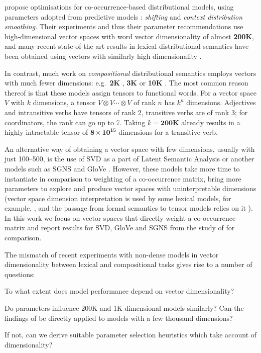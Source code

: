 \documentclass[11pt]{article}
\begin{document}
 propose optimisations for co-occurrence-based distributional models, using parameters adopted from predictive models \cite{mikolov2013efficient}: \emph{shifting} and \emph{context distribution smoothing}. Their experiments and thus their parameter  recommendations use high-dimensional vector spaces with word vector dimensionality of almost \textbf{200K}, and many recent state-of-the-art results in lexical distributional semantics have been obtained using vectors with similarly high dimensionality  \cite{baroni-dinu-kruszewski:2014:P14-1,kiela-clark:2014:CVSC,lapesa2014large}.

In contrast, much work on \emph{compositional} distributional semantics employs vectors with much fewer dimensions: e.g.~\textbf{2K} \cite{Grefenstette:2011:ESC:2145432.2145580,kartsadrqpl2014,milajevs-EtAl:2014:EMNLP2014}, \textbf{3K} \cite{Dinu:2010:MDS:1870658.1870771,milajevs-purver:2014:CVSC} or \textbf{10K} \cite{polajnar-clark:2014:EACL,Baroni2010nouns}. The most common reason thereof is that these models  assign tensors to functional words. For a vector space $V$ with $k$ dimensions,  a tensor $V \otimes V \cdots \otimes V$ of rank $n$ has $k^n$ dimensions. Adjectives and intransitive verbs have tensors of rank 2, transitive verbs are of rank 3; for coordinators, the rank can go up to 7. Taking $k = \textbf{200K}$ already results in a highly intractable tensor of $\textbf{8} \times \textbf{10}^{\textbf{15}}$ dimensions for a transitive verb.

An alternative way of obtaining a vector space with few dimensions, usually with just 100--500, is the use of SVD as a part of Latent Semantic Analysis \cite{ARIS:ARIS1440380105} or another models such as SGNS \cite{mikolov2013efficient} and GloVe \cite{pennington2014glove}. However, these models take more time to instantiate in comparison to weighting of a co-occurrence matrix, bring more parameters to explore and produce vector spaces with uninterpretable dimensions (vector space dimension interpretation is used by some lexical models, for example, , and the passage from formal semantics to tensor models relies on it \cite{DBLP:journals/corr/abs-1003-4394}). In this work we focus on vector spaces that directly weight a co-occurrence matrix and report results for SVD, GloVe and SGNS from the study of  for comparison.

The mismatch of recent experiments with non-dense models in vector dimensionality between lexical and compositional tasks gives rise to a number of questions:
\begin{compactitem}
\item To what extent does model performance depend on vector dimensionality?
\item Do parameters influence 200K and 1K dimensional models similarly? Can the findings of  be directly applied to models with a few thousand dimensions?
\item If not, can we derive suitable parameter selection heuristics which take account of dimensionality?
\end{compactitem}
\end{document}
